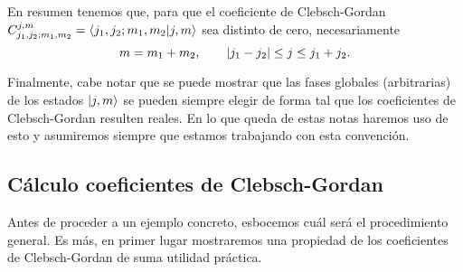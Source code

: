 \documentclass[10pt, a4paper]{article}
\numberwithin{equation}{subsection}
\begin{document}
\bigbreak
{}
\bigbreak

En resumen tenemos que, para que el coeficiente de Clebsch-Gordan
$C_{j_1,j_2;m_1,m_2}^{j,m} = \braket{{j_1},{j_2};{m_1},{m_2}}{{j},{m}}$ sea
distinto de cero, necesariamente
\begin{equation} \label{eq:selrulesumj}
  m = m_1 + m_2, \qquad \abs{j_1 - j_2} \leq j \leq j_1 + j_2.
\end{equation}

\bigbreak

Finalmente, cabe notar que se puede mostrar que las fases globales
(arbitrarias) de los estados $\ket{j,m}$ se pueden siempre elegir de forma tal
que los coeficientes de Clebsch-Gordan resulten reales. En lo que queda de
estas notas haremos uso de esto y asumiremos siempre que estamos trabajando con
esta convención.

\subsection{Cálculo coeficientes de Clebsch-Gordan}

Antes de proceder a un ejemplo concreto, esbocemos cuál será el procedimiento
general. Es más, en primer lugar mostraremos una propiedad de los coeficientes
de Clebsch-Gordan de suma utilidad práctica.
\end{document}
